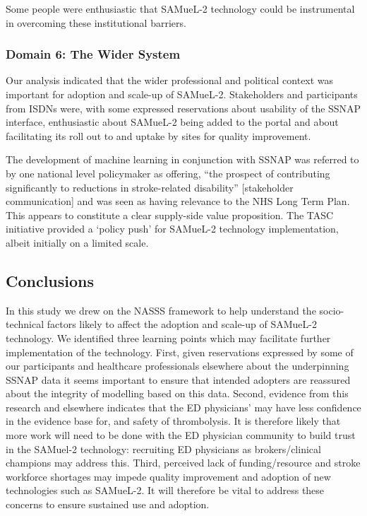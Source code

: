 Some people were enthusiastic that SAMueL-2 technology could be instrumental in overcoming these institutional barriers.

\subsubsection{Domain 6: The Wider System}

Our analysis indicated that the wider professional and political context was important for adoption and scale-up of SAMueL-2. Stakeholders and participants from ISDNs were, with some expressed reservations about usability of the SSNAP interface, enthusiastic about SAMueL-2 being added to the portal and about facilitating its roll out to and uptake by sites for quality improvement.

The development of machine learning in conjunction with SSNAP was referred to by one national level policymaker as offering, “the prospect of contributing significantly to reductions in stroke-related disability” [stakeholder communication] and was seen as having relevance to the NHS Long Term Plan. This appears to constitute a clear supply-side value proposition. The TASC initiative provided a ‘policy push’ for SAMueL-2 technology implementation, albeit initially on a limited scale.

\subsection{Conclusions}

In this study we drew on the NASSS framework to help understand the socio-technical factors likely to affect the adoption and scale-up of SAMueL-2 technology. We identified three learning points which may facilitate further implementation of the technology. First, given reservations expressed by some of our participants and healthcare professionals elsewhere about the underpinning SSNAP data it seems important to ensure that intended adopters are reassured about the integrity of modelling based on this data. Second, evidence from this research and elsewhere indicates that the ED physicians’ may have less confidence in the evidence base for, and safety of thrombolysis. It is therefore likely that more work will need to be done with the ED physician community to build trust in the SAMuel-2 technology: recruiting ED physicians as brokers/clinical champions may address this. Third, perceived lack of funding/resource and stroke workforce shortages may impede quality improvement and adoption of new technologies such as SAMueL-2. It will therefore be vital to address these concerns to ensure sustained use and adoption.